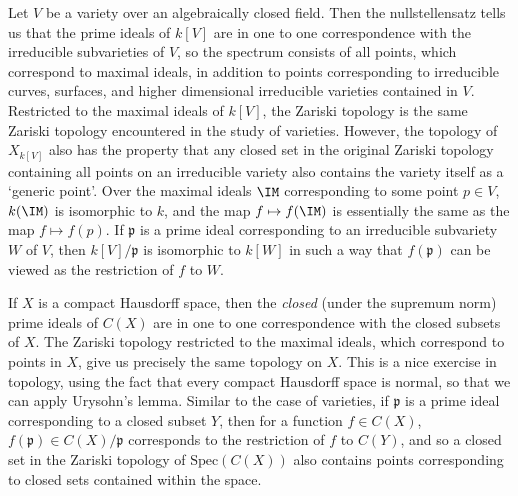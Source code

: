 \begin{example}
    Let $V$ be a variety over an algebraically closed field. Then the nullstellensatz tells us that the prime ideals of $k[V]$ are in one to one correspondence with the irreducible subvarieties of $V$, so the spectrum consists of all points, which correspond to maximal ideals, in addition to points corresponding to irreducible curves, surfaces, and higher dimensional irreducible varieties contained in $V$. Restricted to the maximal ideals of $k[V]$, the Zariski topology is the same Zariski topology encountered in the study of varieties. However, the topology of $X_{k[V]}$ also has the property that any closed set in the original Zariski topology containing all points on an irreducible variety also contains the variety itself as a `generic point'. Over the maximal ideals $\IM$ corresponding to some point $p \in V$, $k(\IM)$ is isomorphic to $k$, and the map $f \mapsto f(\IM)$ is essentially the same as the map $f \mapsto f(p)$. If $\mathfrak{p}$ is a prime ideal corresponding to an irreducible subvariety $W$ of $V$, then $k[V]/\mathfrak{p}$ is isomorphic to $k[W]$ in such a way that $f(\mathfrak{p})$ can be viewed as the restriction of $f$ to $W$.
\end{example}

\begin{example}
    If $X$ is a compact Hausdorff space, then the {\it closed} (under the supremum norm) prime ideals of $C(X)$ are in one to one correspondence with the closed subsets of $X$. The Zariski topology restricted to the maximal ideals, which correspond to points in $X$, give us precisely the same topology on $X$. This is a nice exercise in topology, using the fact that every compact Hausdorff space is normal, so that we can apply Urysohn's lemma. Similar to the case of varieties, if $\mathfrak{p}$ is a prime ideal corresponding to a closed subset $Y$, then for a function $f \in C(X)$, $f(\mathfrak{p}) \in C(X)/\mathfrak{p}$ corresponds to the restriction of $f$ to $C(Y)$, and so a closed set in the Zariski topology of $\text{Spec}(C(X))$ also contains points corresponding to closed sets contained within the space.
\end{example}

